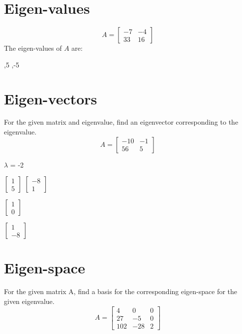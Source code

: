 \documentclass{exam}
\begin{document}
\section{Eigen-values}
\[
  A=
\left[ {\begin{array}{cc}
   -7 & -4 \\
   33 & 16
  \end{array} } \right]
\]
The eigen-values of $A$ are:
\begin{oneparchoices}
 ,5
 ,-5
\end{oneparchoices}

\section{Eigen-vectors}
For the given matrix and eigenvalue, find an eigenvector corresponding to the eigenvalue.
\[
  A=
\left[ {\begin{array}{cc}
   -10 & -1 \\
   56 & 5
  \end{array} } \right]
\]

\begin{center}
\(\lambda\) = -2
\end{center}

\begin{oneparchoices}

  \choice $\begin{bmatrix}
            1 \\
            5
          \end{bmatrix}$
  \choice $\begin{bmatrix}
            -8 \\
            1
          \end{bmatrix}$

  \choice $\begin{bmatrix}
            1 \\
            0
          \end{bmatrix}$

  \choice $\begin{bmatrix}
            1 \\
            -8
          \end{bmatrix}$
\end{oneparchoices}

\section{Eigen-space}
For the given matrix A, find a basis for the corresponding eigen-space for the given eigenvalue.
\[
  A=
\left[ {\begin{array}{ccc}
   4 & 0 & 0 \\
   27 & -5 & 0 \\
   102 & -28 & 2
  \end{array} } \right]
\]
\end{document}
